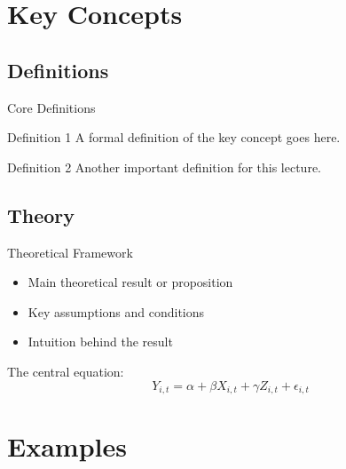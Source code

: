 \documentclass[aspectratio=169]{beamer}
\begin{document}
\section{Key Concepts}

\subsection{Definitions}

\begin{autoframe}{Core Definitions}
    \begin{block}{Definition 1}
        A formal definition of the key concept goes here.
    \end{block}

    \vspace{0.5em}

    \begin{block}{Definition 2}
        Another important definition for this lecture.
    \end{block}
\end{autoframe}

\subsection{Theory}

\begin{autoframe}{Theoretical Framework}
    \begin{itemize}
        \item Main theoretical result or proposition
        \item Key assumptions and conditions
        \item Intuition behind the result
    \end{itemize}

    \vspace{0.5em}
    The central equation:
    \begin{equation}
        Y_{i,t} = \alpha + \beta X_{i,t} + \gamma Z_{i,t} + \epsilon_{i,t}
    \end{equation}
\end{autoframe}


\section{Examples}
\end{document}
